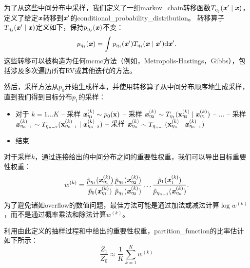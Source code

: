 为了从这些中间分布中采样，我们定义了一组\gls{markov_chain}转移函数$T_{\eta_j}(\boldsymbol{\mathit{x}}' \mid \boldsymbol{\mathit{x}})$，定义了给定$\boldsymbol{\mathit{x}}$转移到$\boldsymbol{\mathit{x}}'$的\gls{conditional_probability_distribution}。
转移算子$T_{\eta_j}(\boldsymbol{\mathit{x}}' \mid \boldsymbol{\mathit{x}})$定义如下，保持$p_{\eta_j}(\boldsymbol{\mathit{x}})$不变：
\begin{equation}
	p_{\eta_j}(\boldsymbol{\mathit{x}}) = \int p_{\eta_j} (\boldsymbol{\mathit{x}}') T_{\eta_j} (\boldsymbol{\mathit{x}} \mid \boldsymbol{\mathit{x}}') \mathrm{d}\boldsymbol{\mathit{x}}'.
\end{equation}
这些转移可以被构造为任何\gls{mcmc}方法（例如，Metropolis-Hastings，Gibbs），包括涉及多次遍历所有\gls{RV}或其他迭代的方法。


然后，采样方法从$p_0$开始生成样本，并使用转移算子从中间分布顺序地生成采样，直到我们得到目标分布$p_1$的采样：
\begin{itemize}
	\item 对于 $k=1 \dots K$ 
		\newline
		\quad\quad -- 采样 $ \boldsymbol{\mathit{x}}_{\eta_1}^{(k)} \sim p_0(\mathbf{x}) $
		\newline
		\quad\quad -- 采样 $ \boldsymbol{\mathit{x}}_{\eta_2}^{(k)} \sim T_{\eta_1}(\mathbf{x}_{\eta_2}^{(k)} \mid \boldsymbol{\mathit{x}}_{\eta_1}^{(k)} ) $
		\newline
		\quad\quad -- $\dots$
		\newline
		\quad\quad -- 采样 $ \boldsymbol{\mathit{x}}_{\eta_{n-1}}^{(k)} \sim T_{\eta_{n-2}}(\mathbf{x}_{\eta_{n-1}}^{(k)} \mid \boldsymbol{\mathit{x}}_{\eta_{n-2}}^{(k)} ) $
		\newline
		\quad\quad -- 采样 $ \boldsymbol{\mathit{x}}_{\eta_n}^{(k)} \sim T_{\eta_{n-1}}(\mathbf{x}_{\eta_n}^{(k)} \mid \boldsymbol{\mathit{x}}_{\eta_{n-1}}^{(k)} ) $
	\item 结束
\end{itemize}


对于采样$k$，通过连接给出的中间分布之间的重要性权重，我们可以导出目标重要性权重：
\begin{equation}
\label{eq:18.52}
	w^{(k)} = \frac{ \tilde{p}_{\eta_1} ( \boldsymbol{\mathit{x}}_{\eta_1}^{(k)} )  }{  \tilde{p}_{0} ( \boldsymbol{\mathit{x}}_{\eta_1}^{(k)} )  }
\frac{ \tilde{p}_{\eta_2} ( \boldsymbol{\mathit{x}}_{\eta_2}^{(k)} )  }{  \tilde{p}_{\eta_1} ( \boldsymbol{\mathit{x}}_{\eta_2}^{(k)} )  }
\dots
\frac{ \tilde{p}_{1} ( \boldsymbol{\mathit{x}}_{1}^{(k)} )  }{  \tilde{p}_{\eta_{n-1}} ( \boldsymbol{\mathit{x}}_{\eta_n}^{(k)} )  } .
\end{equation}
为了避免诸如\gls{overflow}的数值问题，最佳方法可能是通过加法或减法计算$\log w^{(k)}$，而不是通过概率乘法和除法计算$w^{(k)}$。


利用由此定义的抽样过程和中给出的重要性权重，\gls{partition_function}的比率估计如下所示：
\begin{equation}
	\frac{Z_1}{Z_0} \approx \frac{1}{K} \sum_{k=1}^K w^{(k)}
\end{equation}


